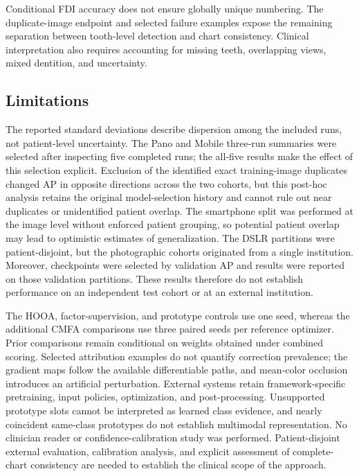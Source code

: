 \documentclass[a4paper,fleqn]{cas-dc}
\begin{document}
Conditional FDI accuracy does not ensure globally unique numbering. The duplicate-image endpoint and selected failure examples expose the remaining separation between tooth-level detection and chart consistency. Clinical interpretation also requires accounting for missing teeth, overlapping views, mixed dentition, and uncertainty.

\subsection{Limitations}

The reported standard deviations describe dispersion among the included runs, not patient-level uncertainty. The Pano and Mobile three-run summaries were selected after inspecting five completed runs; the all-five results make the effect of this selection explicit. Exclusion of the identified exact training-image duplicates changed AP in opposite directions across the two cohorts, but this post-hoc analysis retains the original model-selection history and cannot rule out near duplicates or unidentified patient overlap. The smartphone split was performed at the image level without enforced patient grouping, so potential patient overlap may lead to optimistic estimates of generalization. The DSLR partitions were patient-disjoint, but the photographic cohorts originated from a single institution. Moreover, checkpoints were selected by validation AP and results were reported on those validation partitions. These results therefore do not establish performance on an independent test cohort or at an external institution.

The HOOA, factor-supervision, and prototype controls use one seed, whereas the additional CMFA comparisons use three paired seeds per reference optimizer. Prior comparisons remain conditional on weights obtained under combined scoring. Selected attribution examples do not quantify correction prevalence; the gradient maps follow the available differentiable paths, and mean-color occlusion introduces an artificial perturbation. External systems retain framework-specific pretraining, input policies, optimization, and post-processing. Unsupported prototype slots cannot be interpreted as learned class evidence, and nearly coincident same-class prototypes do not establish multimodal representation. No clinician reader or confidence-calibration study was performed. Patient-disjoint external evaluation, calibration analysis, and explicit assessment of complete-chart consistency are needed to establish the clinical scope of the approach.
\end{document}

